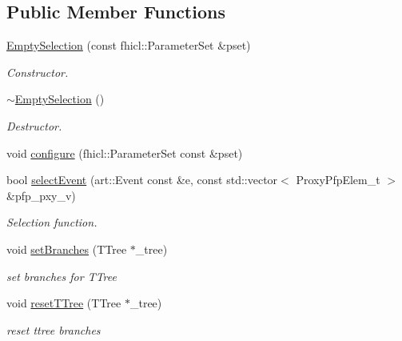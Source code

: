 \subsection*{Public Member Functions}
\begin{DoxyCompactItemize}
\item 
\hyperlink{classselection_1_1EmptySelection_a48affb4fc3524bf814304b3f439900fd}{Empty\-Selection} (const fhicl\-::\-Parameter\-Set \&pset)
\begin{DoxyCompactList}\small\item\em Constructor. \end{DoxyCompactList}\item 
\hypertarget{classselection_1_1EmptySelection_a62d52a58d6da0c8ae7723a405848bd5d}{\hyperlink{classselection_1_1EmptySelection_a62d52a58d6da0c8ae7723a405848bd5d}{$\sim$\-Empty\-Selection} ()}\label{classselection_1_1EmptySelection_a62d52a58d6da0c8ae7723a405848bd5d}

\begin{DoxyCompactList}\small\item\em Destructor. \end{DoxyCompactList}\item 
void \hyperlink{classselection_1_1EmptySelection_a065017fd69d7b8708752bfb1de50fcdc}{configure} (fhicl\-::\-Parameter\-Set const \&pset)
\item 
bool \hyperlink{classselection_1_1EmptySelection_a4ecce282e53d9d7c6c4764eef0b808f7}{select\-Event} (art\-::\-Event const \&e, const std\-::vector$<$ Proxy\-Pfp\-Elem\-\_\-t $>$ \&pfp\-\_\-pxy\-\_\-v)
\begin{DoxyCompactList}\small\item\em Selection function. \end{DoxyCompactList}\item 
\hypertarget{classselection_1_1EmptySelection_a5045b1b4c68a112effabf710714a2ea2}{void \hyperlink{classselection_1_1EmptySelection_a5045b1b4c68a112effabf710714a2ea2}{set\-Branches} (T\-Tree $\ast$\-\_\-tree)}\label{classselection_1_1EmptySelection_a5045b1b4c68a112effabf710714a2ea2}

\begin{DoxyCompactList}\small\item\em set branches for T\-Tree \end{DoxyCompactList}\item 
\hypertarget{classselection_1_1EmptySelection_aa1e91be25d006a7ff65765419a0667ea}{void \hyperlink{classselection_1_1EmptySelection_aa1e91be25d006a7ff65765419a0667ea}{reset\-T\-Tree} (T\-Tree $\ast$\-\_\-tree)}\label{classselection_1_1EmptySelection_aa1e91be25d006a7ff65765419a0667ea}

\begin{DoxyCompactList}\small\item\em reset ttree branches \end{DoxyCompactList}\end{DoxyCompactItemize}
